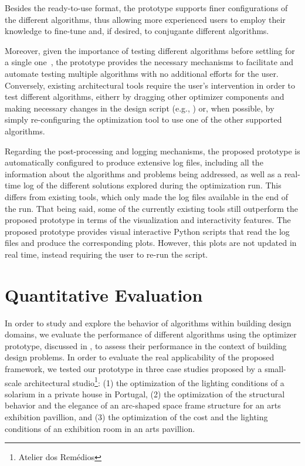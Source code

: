 Besides the ready-to-use format, the prototype supports finer configurations of the different algorithms, thus allowing more experienced users to employ their knowledge to fine-tune and, if desired, to conjugante different algorithms. 

Moreover, given the importance of testing different algorithms before settling for a single one~\cite{Wortmann2016BBO}, the prototype provides the necessary mechanisms to facilitate and automate testing multiple algorithms with no additional efforts for the user. Conversely, existing architectural tools require the user's intervention in order to test different algorithms, eitherr by dragging other optimizer components and making necessary changes in the design script (e.g., ) or, when possible, by simply re-configuring the optimization tool to use one of the other supported algorithms. 

Regarding the post-processing and logging mechanisms, the proposed prototype is automatically configured to produce extensive log files, including all the information about the algorithms and problems being addressed, as well as a real-time log of the different solutions explored during the optimization run. This differs from existing tools, which only made the log files available in the end of the run. That being said, some of the currently existing tools still outperform the proposed prototype in terms of the visualization and interactivity features. The proposed prototype provides visual interactive Python scripts that read the log files and produce the corresponding plots. However, this plots are not updated in real time, instead requiring the user to re-run the script.

\section{Quantitative Evaluation}
\label{sec:quantitative}

In order to study and explore the behavior of algorithms within building design domains, we evaluate the performance of different algorithms using the optimizer prototype,  discussed in , to assess their performance in the context of building design problems. In order to evaluate the real applicability of the proposed framework, we tested our prototype in three case studies proposed by a small-scale architectural studio\footnote{Atelier dos Remédios}: (1) the optimization of the lighting conditions of a solarium in a private house in Portugal, (2) the optimization of the structural behavior and the elegance of an arc-shaped space frame structure for an arts exhibition pavillion, and (3) the optimization of the cost and the lighting conditions of an exhibition room in an arts pavillion.   

